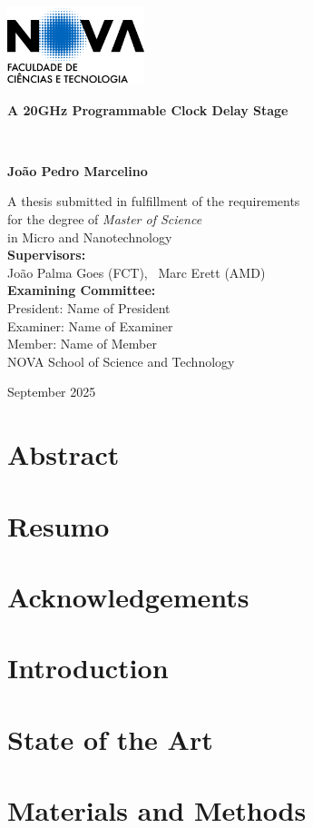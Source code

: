\documentclass[11pt, a4paper]{report}
\newcommand{\importsection}[1]{}
\newcommand{\frontpage}{
    \begin{titlepage}
        \centering
        \includegraphics[width=0.3\textwidth]{figures/university-logo.png}\\ %
        \vspace{2cm}
        {\Huge\bfseries A 20GHz Programmable Clock Delay Stage\par}\
        \centering
        \vspace{1.5cm}
        {\Large\bfseries João Pedro Marcelino\par}
        \vfill
        A thesis submitted in fulfillment of the requirements\\
        for the degree of \emph{Master of Science}\\
        in Micro and Nanotechnology\\
        \vspace{2cm}
        {\bfseries Supervisors:}\\[0.5em]
        João Palma Goes (FCT), \
        Marc Erett (AMD)\\[2cm]
        {\bfseries Examining Committee:}\\[0.5em]
        President: Name of President\\
        Examiner: Name of Examiner\\
        Member: Name of Member\\[2cm]
        NOVA School of Science and Technology\\
        \vspace{1cm}
        {\large September 2025\par}
    \end{titlepage}
}
\newcommand{\copyrightpage}{
    \thispagestyle{empty}
    \vspace*{0.1\textheight} %
    \importsection{copyright} %
    \cleardoublepage
}
\begin{document}



\frontpage%
\thispagestyle{empty}

\copyrightpage


\chapter*{Abstract}
\importsection{abstract} %
\cleardoublepage %

\chapter*{Resumo}
\importsection{resumo} %
\cleardoublepage %

\chapter*{Acknowledgements}
\importsection{acknowledgements}


\tableofcontents
\cleardoublepage

\listoffigures
\cleardoublepage

\listoftables
\cleardoublepage
{}


\setcounter{page}{1}

\chapter{Introduction}
\importsection{introduction}
\cleardoublepage

\chapter{State of the Art}
\importsection{stateoftheart}
\cleardoublepage

\chapter{Materials and Methods}
\importsection{methods}
\cleardoublepage
\end{document}
